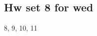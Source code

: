 \documentclass{amsart}
\numberwithin{equation}{section}
\theoremstyle{definition}
\theoremstyle{remark}
\begin{document}
\subsection*{Hw set 8 for wed}
8, 9, 10, 11
\end{document}
